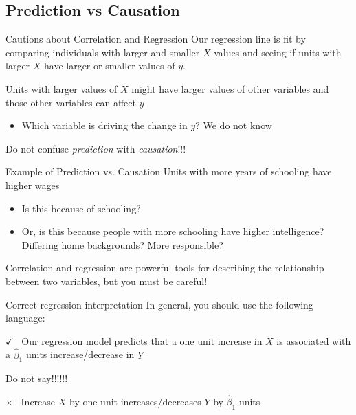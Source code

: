 \documentclass[aspectratio=169,t,11pt,table]{beamer}
\begin{document}
\subsection{Prediction vs Causation}

\begin{frame}{Cautions about Correlation and Regression}
  Our regression line is fit by comparing individuals with larger and smaller $X$ values and seeing if units with larger $X$ have larger or smaller values of $y$. 

  \pause
  \bigskip
  Units with larger values of $X$ might have larger values of other variables and those other variables can affect $y$
  \begin{itemize}
    \item Which variable is driving the change in $y$? We do not know
  \end{itemize}

  Do not confuse \emph{prediction} with \emph{causation}!!! 
\end{frame}

\begin{frame}{Example of Prediction vs. Causation}
  Units with more years of schooling have higher wages
  \begin{itemize}
    \item Is this because of schooling?
    \item Or, is this because people with more schooling have higher intelligence? Differing home backgrounds? More responsible? 
  \end{itemize}

  \pause
  \bigskip\bigskip
  \begin{center}
    Correlation and regression are powerful tools for describing the relationship between two variables, but you must be careful! 
  \end{center}
\end{frame}

\begin{frame}{Correct regression interpretation}
  In general, you should use the following language:
  
  \begin{tcolorbox}[boxrule = 0pt, frame hidden, sharp corners, enhanced, borderline west = {4pt}{0pt}{green}, interior hidden]
    {\color{green}\Large $\checkmark$\ } Our regression model predicts that a one unit increase in $X$ is associated with a $\hat{\beta}_1$ units increase/decrease in $Y$
  \end{tcolorbox}

  \bigskip
  Do not say!!!!!! 
  \begin{tcolorbox}[boxrule = 0pt, frame hidden, sharp corners, enhanced, borderline west = {4pt}{0pt}{red}, interior hidden]
   {\color{red}\Large $\times$\ } Increase $X$ by one unit increases/decreases $Y$ by $\hat{\beta}_1$ units
  \end{tcolorbox}
\end{frame}
\end{document}
